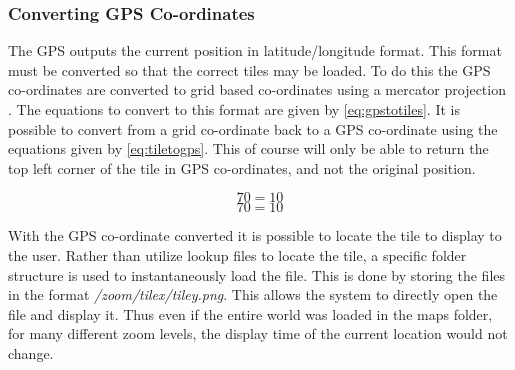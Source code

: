 
\subsubsection{Converting GPS Co-ordinates}

The GPS outputs the current position in latitude/longitude format. This format must be converted so that the correct tiles may be loaded. To do this the GPS co-ordinates are converted to grid based co-ordinates using a mercator projection \cite{slippy_map_tilenames}. The equations to convert to this format are given by \ref{eq:gpstotiles}. It is possible to convert from a grid co-ordinate back to a GPS co-ordinate using the equations given by \ref{eq:tiletogps}. This of course will only be able to return the top left corner of the tile in GPS co-ordinates, and not the original position.

\begin{equation}
\label{eq:gpstotiles}
70=10
\end{equation}
\begin{equation}
\label{eq:tilestogps}
70=10
\end{equation}

With the GPS co-ordinate converted it is possible to locate the tile to display to the user. Rather than utilize lookup files to locate the tile, a specific folder structure is used to instantaneously load the file. This is done by storing the files in the format \emph{/zoom/tilex/tiley.png}. This allows the system to directly open the file and display it. Thus even if the entire world was loaded in the maps folder, for many different zoom levels, the display time of the current location would not change.


